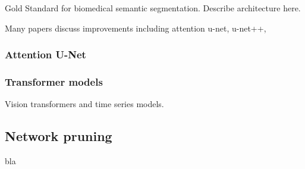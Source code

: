 Gold Standard for biomedical semantic segmentation. Describe architecture here.

Many papers discuss improvements including attention u-net, u-net++, 

\subsubsection{Attention U-Net}

\subsubsection{Transformer models}

Vision transformers and time series models.


\subsection{Network pruning}
bla